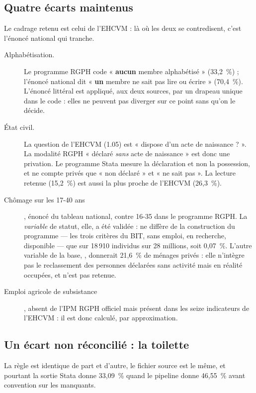 \documentclass[11pt,a4paper]{article}
\begin{document}
\subsection{Quatre écarts maintenus}

Le cadrage retenu est celui de l'EHCVM : là où les deux se contredisent, c'est l'énoncé national
qui tranche.

\begin{description}
  \item[Alphabétisation.] Le programme RGPH code « \textbf{aucun} membre alphabétisé » (33,2~\%) ;
    l'énoncé national dit « \textbf{un} membre ne sait pas lire ou écrire » (70,4~\%). L'énoncé
    littéral est appliqué, aux deux sources, par un drapeau unique dans le code : elles ne peuvent
    pas diverger sur ce point sans qu'on le décide.

  \item[État civil.] La question de l'EHCVM (1.05) est « dispose d'un acte de naissance ? ». La
    modalité RGPH « déclaré \emph{sans} acte de naissance » est donc une privation. Le programme
    Stata mesure la déclaration et non la possession, et ne compte privés que « non déclaré » et
    « ne sait pas ». La lecture retenue (15,2~\%) est aussi la plus proche de l'EHCVM (26,3~\%).

  \item[Chômage sur les 17-40 ans], énoncé du tableau national, contre 16-35 dans le programme
    RGPH. La \emph{variable} de statut, elle, a été validée :  ne diffère de la
    construction du programme --- les trois critères du BIT, sans emploi, en recherche, disponible
    --- que sur 18\,910 individus sur 28 millions, soit 0,07~\%. L'autre variable de la base,
    , donnerait 21,6~\% de ménages privés : elle n'intègre pas le reclassement
    des personnes déclarées sans activité mais en réalité occupées, et n'est pas retenue.

  \item[Emploi agricole de subsistance], absent de l'IPM RGPH officiel mais présent dans les seize
    indicateurs de l'EHCVM : il est donc calculé, par approximation.
\end{description}

\subsection{Un écart non réconcilié : la toilette}

La règle est identique de part et d'autre, le fichier source est le même, et pourtant la sortie
Stata donne 33,09~\% quand le pipeline donne 46,55~\% avant convention sur les manquants.
\end{document}
